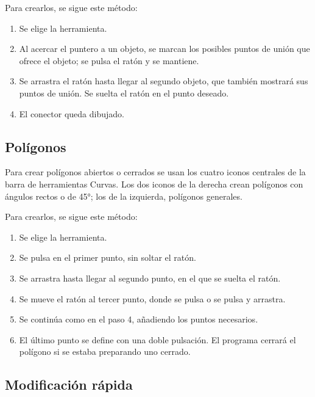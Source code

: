 Para crearlos, se sigue este método:

\begin{enumerate}
\item Se elige la herramienta.

\item Al acercar el puntero a un objeto, se marcan los posibles puntos
 de unión que ofrece el objeto; se pulsa el ratón y se mantiene.

\item Se arrastra el ratón hasta llegar al segundo objeto, que también 
mostrará sus puntos de unión. Se suelta el ratón en el punto deseado.

\item El conector queda dibujado.
\end{enumerate}

\subsection{Polígonos}

Para crear polígonos abiertos o cerrados se usan los cuatro iconos
centrales de la barra de herramientas Curvas. Los dos iconos de la
derecha crean polígonos con ángulos rectos o de 45°; los de la
izquierda, polígonos generales.

Para crearlos, se sigue este método:

\begin{enumerate}
\item Se elige la herramienta.

\item Se pulsa en el primer punto, sin soltar el ratón.

\item Se arrastra hasta llegar al segundo punto, en el que se 
suelta el ratón.

\item Se mueve el ratón al tercer punto, donde se pulsa o se 
pulsa y arrastra.

\item Se continúa como en el paso 4, añadiendo los puntos necesarios.

\item El último punto se define con una doble pulsación. El programa 
cerrará el polígono si se estaba preparando uno cerrado.
\end{enumerate}

\subsection{Modificación rápida}

